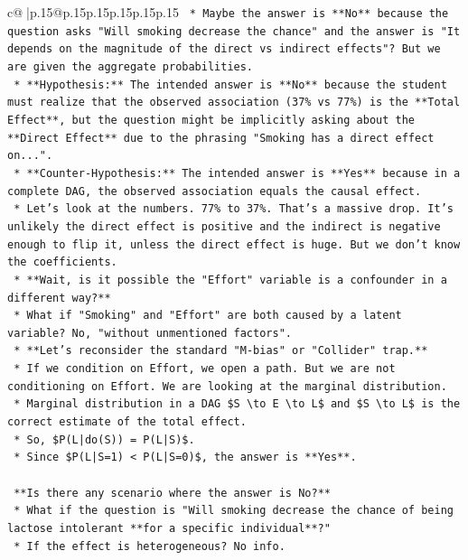 \documentclass{article}
\begin{document}
{\begin{supertabular}{c@{$\;$}|p{.15\linewidth}@{}p{.15\linewidth}p{.15\linewidth}p{.15\linewidth}p{.15\linewidth}p{.15\linewidth}}
{{{\texttt{        *   Maybe the answer is **No** because the question asks "Will smoking decrease the chance" and the answer is "It depends on the magnitude of the direct vs indirect effects"? But we are given the aggregate probabilities.} \\
\texttt{        *   **Hypothesis:** The intended answer is **No** because the student must realize that the observed association (37\% vs 77\%) is the **Total Effect**, but the question might be implicitly asking about the **Direct Effect** due to the phrasing "Smoking has a direct effect on...".} \\
\texttt{        *   **Counter{-}Hypothesis:** The intended answer is **Yes** because in a complete DAG, the observed association equals the causal effect.} \\
\texttt{        *   Let's look at the numbers. 77\% to 37\%. That's a massive drop. It's unlikely the direct effect is positive and the indirect is negative enough to flip it, unless the direct effect is huge. But we don't know the coefficients.} \\
\texttt{        *   **Wait, is it possible the "Effort" variable is a confounder in a different way?**} \\
\texttt{            *   What if "Smoking" and "Effort" are both caused by a latent variable? No, "without unmentioned factors".} \\
\texttt{        *   **Let's reconsider the standard "M{-}bias" or "Collider" trap.**} \\
\texttt{            *   If we condition on Effort, we open a path. But we are not conditioning on Effort. We are looking at the marginal distribution.} \\
\texttt{            *   Marginal distribution in a DAG \$S \textbackslash{}to E \textbackslash{}to L\$ and \$S \textbackslash{}to L\$ is the correct estimate of the total effect.} \\
\texttt{            *   So, \$P(L|do(S)) = P(L|S)\$.} \\
\texttt{            *   Since \$P(L|S=1) < P(L|S=0)\$, the answer is **Yes**.} \\
\\ 
\texttt{    **Is there any scenario where the answer is No?**} \\
\texttt{    *   What if the question is "Will smoking decrease the chance of being lactose intolerant **for a specific individual**?"} \\
\texttt{    *   If the effect is heterogeneous? No info.} \\
}}}
\end{supertabular}}
\end{document}
